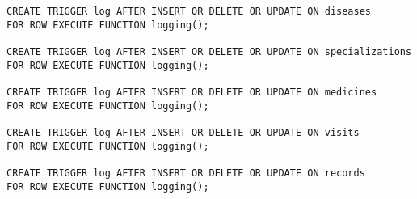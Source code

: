 \begin{appendices}
\begin{lstlisting}[caption={Сценарий создания логирующего триггера}]
CREATE TRIGGER log AFTER INSERT OR DELETE OR UPDATE ON diseases
FOR ROW EXECUTE FUNCTION logging();

CREATE TRIGGER log AFTER INSERT OR DELETE OR UPDATE ON specializations
FOR ROW EXECUTE FUNCTION logging();

CREATE TRIGGER log AFTER INSERT OR DELETE OR UPDATE ON medicines
FOR ROW EXECUTE FUNCTION logging();

CREATE TRIGGER log AFTER INSERT OR DELETE OR UPDATE ON visits
FOR ROW EXECUTE FUNCTION logging();

CREATE TRIGGER log AFTER INSERT OR DELETE OR UPDATE ON records
FOR ROW EXECUTE FUNCTION logging();
\end{lstlisting}

\end{appendices}